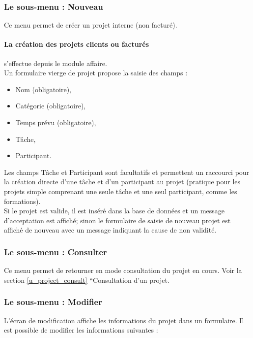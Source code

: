 \subsubsection{Le sous-menu : Nouveau}

Ce menu permet de créer un projet interne (non facturé).

\paragraph{La création des projets clients ou facturés} s'effectue depuis le module affaire.\\

Un formulaire vierge de projet propose la saisie des champs :

\begin{itemize}
\item Nom (obligatoire),
\item Catégorie (obligatoire),
\item Temps prévu (obligatoire),
\item Tâche,
\item Participant.
\end{itemize}
\vspace{0.3cm}

Les champs Tâche et Participant sont facultatifs et permettent un raccourci pour la création directe d'une tâche et d'un participant au projet (pratique pour les projets simple comprenant une seule tâche et une seul participant, comme les formations).\\

Si le projet est valide, il est inséré dans la base de données et un message d'acceptation est affiché; sinon le formulaire de saisie de nouveau projet est affiché de nouveau avec un message indiquant la cause de non validité.


\subsubsection{Le sous-menu : Consulter}

Ce menu permet de retourner en mode consultation du projet en cours.
Voir la section \ref{u_project_consult} ``Consultation d'un projet.


\subsubsection{Le sous-menu : Modifier}

L'écran de modification affiche les informations du projet dans un formulaire.
Il est possible de modifier les informations suivantes :

